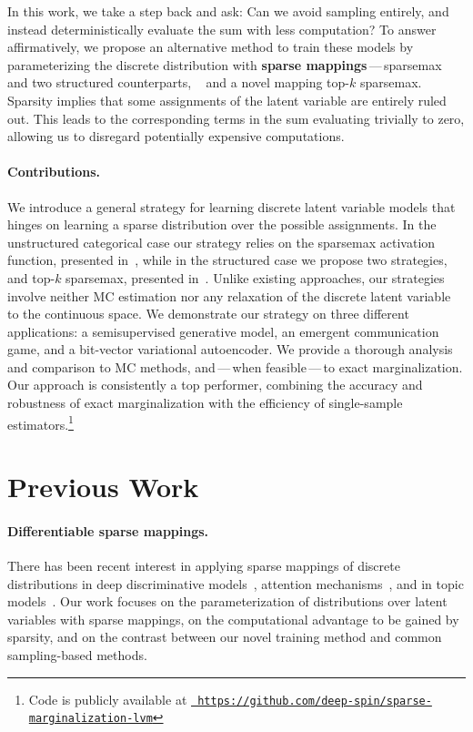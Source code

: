 In this work, we take a step back and ask: Can we avoid sampling
entirely, and instead deterministically evaluate the sum with less
computation? To answer affirmatively, we propose an alternative
method to train these models by parameterizing the discrete
distribution with {\bf sparse
        mappings}\,---\,sparsemax~\citep{martins2016softmax} and two
structured counterparts, \smap~\citep{niculae2018sparsemap} and a
novel mapping top-$k$ sparsemax. Sparsity implies that some
assignments of the latent variable are entirely ruled out. This leads
to the corresponding terms in the sum evaluating trivially to zero,
allowing us to disregard potentially expensive computations.

\paragraph*{Contributions.} We introduce a general strategy for
learning discrete latent variable models that hinges on
learning a sparse distribution over the possible assignments. In the
unstructured categorical case our strategy relies on the sparsemax
activation function, presented in~, while in the
structured case we propose two strategies, \smap and top-$k$
sparsemax, presented in~. Unlike existing
approaches, our strategies involve neither MC estimation nor any
relaxation of the discrete latent variable to the continuous space.
We demonstrate our strategy on three different applications: a
semisupervised generative model, an emergent communication game, and
a bit-vector variational autoencoder. We provide a thorough analysis
and comparison to MC methods, and\,---\,when feasible\,---\,to exact
marginalization. Our approach is consistently a top performer,
combining the accuracy and robustness of exact marginalization with
the efficiency of single-sample estimators.\footnote{Code is publicly
    available at
    \href{https://github.com/deep-spin/sparse-marginalization-lvm}{\tt
        https://github.com/deep-spin/sparse-marginalization-lvm}}

\section{Previous Work}

\paragraph*{Differentiable sparse mappings.} There has been recent
interest in applying sparse mappings of discrete distributions in
deep discriminative models~\citep{martins2016softmax,
    niculae2018sparsemap, fusedmax, entmax, sparsemapcg}, attention
mechanisms~\citep{malaviya2018sparse, shao2019ssn,
    maruf2019selective, correia2019adaptively}, and in topic
models~\citep{caothesis}. Our work focuses on the parameterization of
distributions over latent variables with sparse mappings, on the
computational advantage to be gained by sparsity, and on the contrast
between our novel training method and common sampling-based methods.

